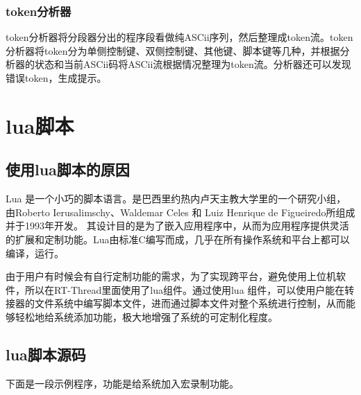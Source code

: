 \subsubsection{token分析器}
token分析器将分段器分出的程序段看做纯ASCii序列，然后整理成token流。token分析器将token分为单侧控制键、双侧控制键、其他键、脚本键等几种，并根据分析器的状态和当前ASCii码将ASCii流根据情况整理为token流。分析器还可以发现错误token，生成提示。

\section{lua脚本}
\subsection{使用lua脚本的原因}
Lua 是一个小巧的脚本语言。是巴西里约热内卢天主教大学里的一个研究小组，由Roberto Ierusalimschy、Waldemar Celes 和 Luiz Henrique de Figueiredo所组成并于1993年开发。 其设计目的是为了嵌入应用程序中，从而为应用程序提供灵活的扩展和定制功能。Lua由标准C编写而成，几乎在所有操作系统和平台上都可以编译，运行。

由于用户有时候会有自行定制功能的需求，为了实现跨平台，避免使用上位机软件，所以在RT-Thread里面使用了lua组件。通过使用lua 组件，可以使用户能在转接器的文件系统中编写脚本文件，进而通过脚本文件对整个系统进行控制，从而能够轻松地给系统添加功能，极大地增强了系统的可定制化程度。
\subsection{lua脚本源码}
下面是一段示例程序，功能是给系统加入宏录制功能。







